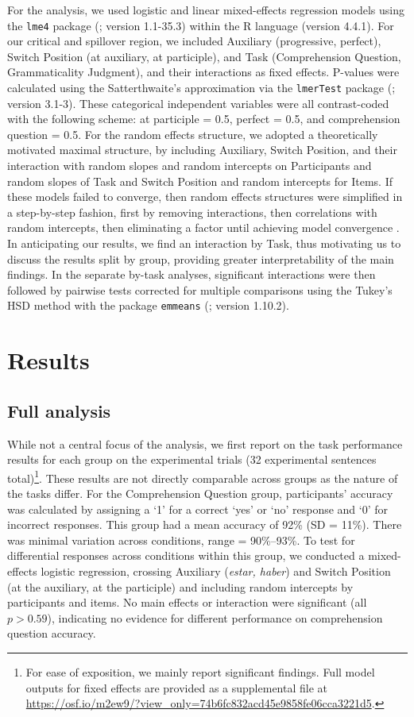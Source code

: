\documentclass[output=paper,colorlinks,citecolor=brown]{langscibook}
\begin{document}
For the analysis, we used logistic and linear mixed-effects regression models using the \texttt{lme4} package (\cite{Batesetal2015}; version 1.1-35.3) within the R language (version 4.4.1). For our critical and spillover region, we included Auxiliary (progressive, perfect), Switch Position (at auxiliary, at participle), and Task (Comprehension Question, Grammaticality Judgment), and their interactions as fixed effects. P-values were calculated using the Satterthwaite’s approximation via the \texttt{lmerTest} package (\cite{Kuznetsovaetal2017}; version 3.1-3). These categorical independent variables were all contrast-coded with the following scheme: at participle = 0.5, perfect = 0.5, and comprehension question = 0.5. For the random effects structure, we adopted a theoretically motivated maximal structure, by including Auxiliary, Switch Position, and their interaction with random slopes and random intercepts on Participants and random slopes of Task and Switch Position and random intercepts for Items. If these models failed to converge, then random effects structures were simplified in a step-by-step fashion, first by removing interactions, then correlations with random intercepts, then eliminating a factor until achieving model convergence \citep{Barretal2013}. In anticipating our results, we find an interaction by Task, thus motivating us to discuss the results split by group, providing greater interpretability of the main findings. In the separate by-task analyses, significant interactions were then followed by pairwise tests corrected for multiple comparisons using the Tukey’s HSD method with the package \texttt{emmeans} (\cite{Lenth2024}; version 1.10.2).

\section{Results}
\subsection{Full analysis}
While not a central focus of the analysis, we first report on the task performance results for each group on the experimental trials (32 experimental sentences total)\footnote{For ease of exposition, we mainly report significant findings. Full model outputs for fixed effects are provided as a supplemental file at \url{https://osf.io/m2ew9/?view_only=74b6fc832acd45e9858fe06cca3221d5}.}. These results are not directly comparable across groups as the nature of the tasks differ. For the Comprehension Question group, participants’ accuracy was calculated by assigning a `1' for a correct `yes' or `no' response and `0' for incorrect responses. This group had a mean accuracy of 92\% (SD = 11\%). There was minimal variation across conditions, range = 90\%--93\%. To test for differential responses across conditions within this group, we conducted a mixed-effects logistic regression, crossing Auxiliary (\textit{estar, haber}) and Switch Position (at the auxiliary, at the participle) and including random intercepts by participants and items. No main effects or interaction were significant (all $p > 0.59$), indicating no evidence for different performance on comprehension question accuracy.
\end{document}
